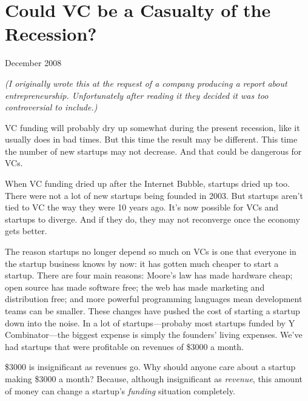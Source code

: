 \chapter{Could VC be a Casualty of the Recession?}


            
              
                

December 2008

\emph{(I originally wrote this at the request of a company
                    producing a report about entrepreneurship. Unfortunately
                    after reading it they decided it was too controversial to
                    include.)}


                  VC funding will probably dry up somewhat during the present
                  recession, like it usually does in bad times. But this time
                  the result may be different. This time the number of new
                  startups may not decrease. And that could be dangerous for
                  VCs.

When VC funding dried up after the Internet
                  Bubble, startups dried up too. There were not a lot of new
                  startups being founded in 2003. But startups aren't tied to VC
                  the way they were 10 years ago. It's now possible for VCs and
                  startups to diverge. And if they do, they may not reconverge
                  once the economy gets better.

The reason startups
                  no longer depend so much on VCs is one that everyone in the
                  startup business knows by now: it has gotten much cheaper to
                  start a startup. There are four main reasons: Moore's law has
                  made hardware cheap; open source has made software free; the
                  web has made marketing and distribution free; and more
                  powerful programming languages mean development teams can be
                  smaller. These changes have pushed the cost of starting a
                  startup down into the noise. In a lot of
                  startups---probaby most startups funded by Y
                  Combinator---the biggest expense is simply the founders'
                  living expenses. We've had startups that were profitable on
                  revenues of \$3000 a month.

\$3000 is insignificant
                  as revenues go. Why should anyone care about a startup making
                  \$3000 a month? Because, although insignificant as
                  \emph{revenue}, this amount of money can change a startup's
                  \emph{funding} situation completely.

